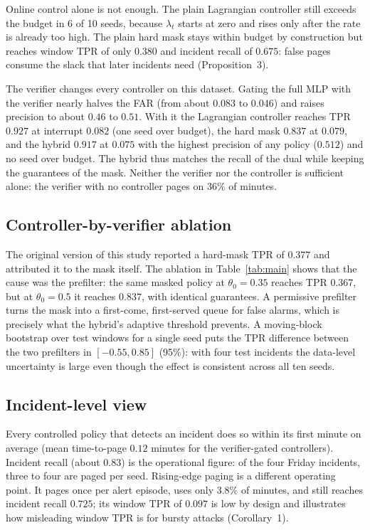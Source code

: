 \documentclass[journal,10pt,twocolumn]{IEEEtran}
\begin{document}
Online control alone is not enough. The plain Lagrangian controller still exceeds the budget in 6 of 10 seeds, because $\lambda_t$ starts at zero and rises only after the rate is already too high. The plain hard mask stays within budget by construction but reaches window TPR of only $0.380$ and incident recall of $0.675$: false pages consume the slack that later incidents need (Proposition~3).

The verifier changes every controller on this dataset. Gating the full MLP with the verifier nearly halves the FAR (from about $0.083$ to $0.046$) and raises precision to about $0.46$ to $0.51$. With it the Lagrangian controller reaches TPR $0.927$ at interrupt $0.082$ (one seed over budget), the hard mask $0.837$ at $0.079$, and the hybrid $0.917$ at $0.075$ with the highest precision of any policy ($0.512$) and no seed over budget. The hybrid thus matches the recall of the dual while keeping the guarantees of the mask. Neither the verifier nor the controller is sufficient alone: the verifier with no controller pages on $36\%$ of minutes.

\subsection{Controller-by-verifier ablation}
The original version of this study reported a hard-mask TPR of $0.377$ and attributed it to the mask itself. The ablation in Table~\ref{tab:main} shows that the cause was the prefilter: the same masked policy at $\theta_0=0.35$ reaches TPR $0.367$, but at $\theta_0=0.5$ it reaches $0.837$, with identical guarantees. A permissive prefilter turns the mask into a first-come, first-served queue for false alarms, which is precisely what the hybrid's adaptive threshold prevents. A moving-block bootstrap over test windows for a single seed puts the TPR difference between the two prefilters in $[-0.55,0.85]$ (95\%): with four test incidents the data-level uncertainty is large even though the effect is consistent across all ten seeds.

\subsection{Incident-level view}
Every controlled policy that detects an incident does so within its first minute on average (mean time-to-page $0.12$ minutes for the verifier-gated controllers). Incident recall (about $0.83$) is the operational figure: of the four Friday incidents, three to four are paged per seed. Rising-edge paging is a different operating point. It pages once per alert episode, uses only $3.8\%$ of minutes, and still reaches incident recall $0.725$; its window TPR of $0.097$ is low by design and illustrates how misleading window TPR is for bursty attacks (Corollary~1).
\end{document}

